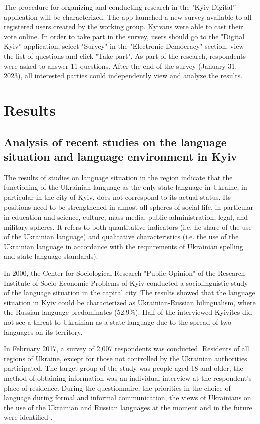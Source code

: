 \documentclass[english]{textolivre}
\begin{document}
The procedure for organizing and conducting research in the "Kyiv Digital'' application will be characterized. The app launched a new survey available to all registered users created by the working group. Kyivans were able to cast their vote online. In order to take part in the survey, users should go to the "Digital Kyiv'' application, select "Survey" in the "Electronic Democracy" section, view the list of questions and click "Take part". As part of the research, respondents were asked to answer 11 questions. After the end of the survey (January 31, 2023), all interested parties could independently view and analyze the results.

\section{Results}

\subsection{Analysis of recent studies on the language situation and language environment in Kyiv}

The results of studies on language situation in the region indicate that the functioning of the Ukrainian language as the only state language in Ukraine, in particular in the city of Kyiv, does not correspond to its actual status. Its positions need to be strengthened in almost all spheres of social life, in particular in education and science, culture, mass media, public administration, legal, and military spheres. It refers to both quantitative indicators (i.e. he share of the use of the Ukrainian language) and qualitative characteristics (i.e. the use of the Ukrainian language in accordance with the requirements of Ukrainian spelling and state language standards).

In 2000, the Center for Sociological Research "Public Opinion" of the Research Institute of Socio-Economic Problems of Kyiv conducted a sociolinguistic study of the language situation in the capital city. The results showed that the language situation in Kyiv could be characterized as Ukrainian-Russian bilingualism, where the Russian language predominates (52.9\%). Half of the interviewed Kyivites did not see a threat to Ukrainian as a state language due to the spread of two languages on its territory.

In February 2017, a survey of 2,007 respondents was conducted. Residents of all regions of Ukraine, except for those not controlled by the Ukrainian authorities participated. The target group of the study was people aged 18 and older, the method of obtaining information was an individual interview at the respondent's place of residence. During the questionnaire, the priorities in the choice of language during formal and informal communication, the views of Ukrainians on the use of the Ukrainian and Russian languages at the moment and in the future were identified \cite{matveieva2020}.
\end{document}

